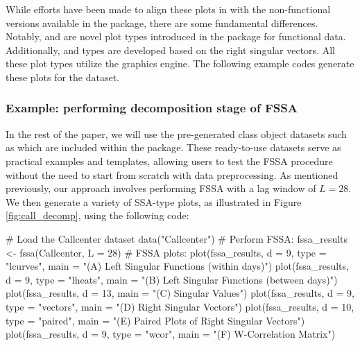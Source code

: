 While efforts have been made to align these plots in  with the non-functional versions available in the  package, there are some fundamental differences. Notably,  and   are novel plot types introduced in the  package for functional data. Additionally,  and  types are developed based on the right singular vectors. All these plot types utilize the  graphics engine. The following example codes generate these plots for the  dataset.
\subsubsection{Example: performing decomposition stage of FSSA}
In the rest of the paper, we will use the pre-generated  class object datasets such as 
 which are included within the package. These ready-to-use datasets serve as practical 
examples and templates, allowing users to test the FSSA procedure without the need 
to start from scratch with data preprocessing.
As mentioned previously, our approach involves performing FSSA with a lag window of 
$L=28$. We then generate a variety of SSA-type plots, as illustrated in Figure 
\ref{fig:call_decomp}, using the following code:
\begin{example}
# Load the Callcenter dataset
data("Callcenter")
# Perform FSSA:
fssa_results <- fssa(Callcenter, L = 28)
# FSSA plots:
plot(fssa_results, d = 9, type = "lcurves", 
	main = "(A) Left Singular Functions (within days)")
plot(fssa_results, d = 9, type = "lheats",
	main = "(B) Left Singular Functions (between days)")
plot(fssa_results, d = 13, main = "(C) Singular Values")
plot(fssa_results, d = 9, type = "vectors",
	main = "(D) Right Singular Vectors")
plot(fssa_results, d = 10, type = "paired",
	main = "(E) Paired Plots of Right Singular Vectors")
plot(fssa_results, d = 9, type = "wcor",
	main = "(F) W-Correlation Matrix")
\end{example}

